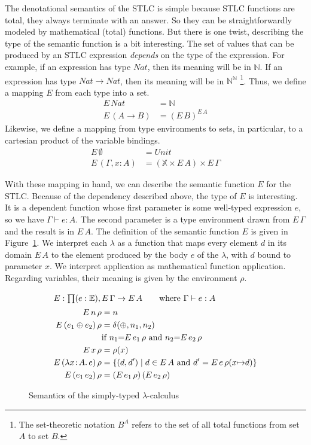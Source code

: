 \documentclass{tufte-handout}
\newcommand{\LAM}[1]{\lambda #1.\,}
\newcommand{\APP}[0]{\,}
\newcommand{\of}[0]{\!:\!}
\newcommand{\NAT}[0]{\mathbb{N}}
\newcommand{\NATTY}[0]{\mathit{Nat}}
\newcommand{\UNITTY}[0]{\mathit{Unit}}
\newcommand{\VAR}[0]{\mathbb{X}}
\newcommand{\EXP}[0]{\mathbb{E}}
\newcommand{\ext}[3]{#3(#1{\mapsto}#2)}
\begin{document}
The denotational semantics of the STLC is simple because STLC
functions are total, they always terminate with an answer. So they can
be straightforwardly modeled by mathematical (total) functions. But
there is one twist, describing the type of the semantic function is a
bit interesting.  The set of values that can be produced by an STLC
expression \emph{depends} on the type of the expression. For example,
if an expression has type $\NATTY$, then its meaning will be in
$\NAT$. If an expression has type $\NATTY \to \NATTY$, then its
meaning will be in $\NAT^{\NAT}$
\footnote{The set-theoretic notation $B^A$ refers to the set of all
  total functions from set $A$ to set $B$.}.  Thus, we define a
mapping $E$ from each type into a set.
\begin{align*}
  E\,\NATTY &= \mathbb{N} \\
  E\,(A \to B) &=  (E\,B)^{E\,A}
\end{align*}
Likewise, we define a mapping from type environments to sets, in
particular, to a cartesian product of the variable bindings.
\begin{align*}
  E\,\emptyset &= \UNITTY \\
  E\,(\Gamma,x\of A) &= (\VAR \times E\,A) \times E\,\Gamma
\end{align*}

With these mapping in hand, we can describe the semantic function $E$
for the STLC. Because of the dependency described above, the type of
$E$ is interesting. It is a dependent function whose first parameter
is some well-typed expression $e$, so we have $\Gamma \vdash e : A$.
The second parameter is a type environment drawn from $E\,\Gamma$ and
the result is in $E\,A$.  The definition of the semantic function $E$
is given in Figure~\ref{fig:sem-stlc}.  We interpret each $\lambda$ as
a function that maps every element $d$ in its domain $E\,A$ to the
element produced by the body $e$ of the $\lambda$, with $d$ bound to
parameter $x$. We interpret application as mathematical function
application. Regarding variables, their meaning is given by the
environment $\rho$.

\begin{figure}[tbp]
\begin{align*}
\intertext{$E : \prod (e : \EXP), E\,\Gamma \to E\,A \qquad \text{where } \Gamma \vdash e : A$}
  E\,n\,\rho &= n \\
  E\,(e_1\oplus e_2)\,\rho &= \delta(\oplus,n_1, n_2) \\
     & \text{if } n_1 {=} E\,e_1\,\rho \text{ and } n_2 {=} E\,e_2\,\rho \\
  E\,x\,\rho &= \rho(x) \\
  E\,(\LAM{x\of A}e)\,\rho &= \{ (d,d') \mid d \in E\,A \text{ and } d' = E\,e\,\ext{x}{d}{\rho} \} \\
  E\,(e_1 \APP e_2)\,\rho &= (E\,e_1\,\rho) \APP (E\,e_2\,\rho)
\end{align*}

\caption{Semantics of the simply-typed $\lambda$-calculus}
\label{fig:sem-stlc}
\end{figure}
\end{document}

